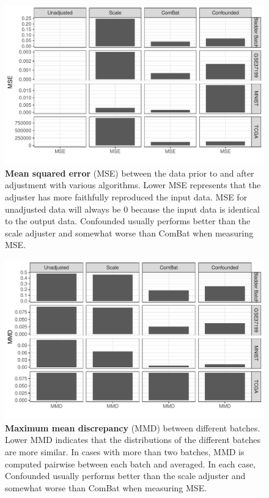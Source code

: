 \documentclass[notitlepage]{article}
\begin{document}
\begin{figure}
	\centering
	\includegraphics[width=\columnwidth]{figures/final/mse.pdf}
	\caption{\textbf{Mean squared error} (MSE) between the data prior to and after adjustment with various algorithms.
	Lower MSE represents that the adjuster has more faithfully reproduced the input data.
	MSE for unadjusted data will always be 0 because the input data is identical to the output data.
	Confounded usually performs better than the scale adjuster and somewhat worse than ComBat when measuring MSE.}
	\label{fig:mse}
\end{figure}
\begin{figure}
	\centering
	\includegraphics[width=\columnwidth]{figures/final/mmd.pdf}
	\caption{\textbf{Maximum mean discrepancy} (MMD) between different batches. Lower MMD indicates that the distributions of the different batches are more similar.
	In cases with more than two batches, MMD is computed pairwise between each batch and averaged.
	In each case, Confounded usually performs better than the scale adjuster and somewhat worse than ComBat when measuring MSE.}
	\label{fig:mmd}
\end{figure}
\end{document}
